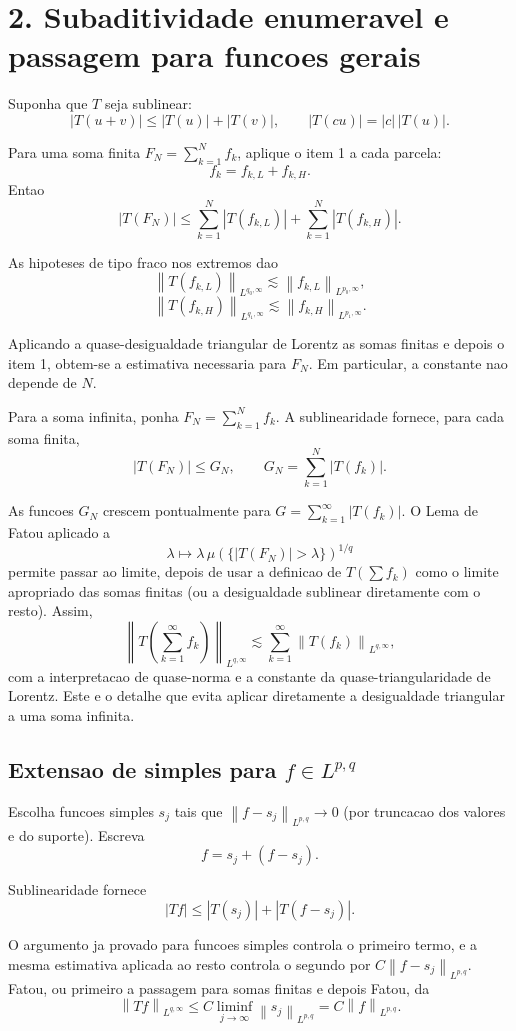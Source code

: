 \documentclass[12pt,a4paper]{article}
\newcommand{\norm}[2]{\left\|#1\right\|_{#2}}
\begin{document}
\section*{2. Subaditividade enumeravel e passagem para funcoes gerais}

Suponha que $T$ seja sublinear:
\[
|T(u+v)|\leq |T(u)|+|T(v)|, \qquad |T(cu)|=|c|\,|T(u)|.
\]

Para uma soma finita $F_N=\sum_{k=1}^Nf_k$, aplique o item 1 a cada parcela:
\[
f_k=f_{k,L}+f_{k,H}.
\]
Entao
\[
|T(F_N)|\leq\sum_{k=1}^N|T(f_{k,L})|
+\sum_{k=1}^N|T(f_{k,H})|.
\]

As hipoteses de tipo fraco nos extremos dao
\[
\norm{T(f_{k,L})}{L^{q_0,\infty}}
\lesssim \norm{f_{k,L}}{L^{p_0,\infty}},
\]
\[
\norm{T(f_{k,H})}{L^{q_1,\infty}}
\lesssim \norm{f_{k,H}}{L^{p_1,\infty}}.
\]

Aplicando a quase-desigualdade triangular de Lorentz as somas finitas e depois
o item 1, obtem-se a estimativa necessaria para $F_N$. Em particular, a
constante nao depende de $N$.

Para a soma infinita, ponha $F_N=\sum_{k=1}^Nf_k$. A sublinearidade fornece,
para cada soma finita,
\[
|T(F_N)|\leq G_N, \qquad G_N=\sum_{k=1}^N|T(f_k)|.
\]

As funcoes $G_N$ crescem pontualmente para
$G=\sum_{k=1}^{\infty}|T(f_k)|$. O Lema de Fatou aplicado a
\[
\lambda\longmapsto
\lambda\,\mu(\{|T(F_N)|>\lambda\})^{1/q}
\]
permite passar ao limite, depois de usar a definicao de $T(\sum f_k)$ como o
limite apropriado das somas finitas (ou a desigualdade sublinear diretamente
com o resto). Assim,
\[
\norm{T(\sum_{k=1}^{\infty}f_k)}{L^{q,\infty}}
\lesssim\sum_{k=1}^{\infty}\norm{T(f_k)}{L^{q,\infty}},
\]
com a interpretacao de quase-norma e a constante da quase-triangularidade de
Lorentz. Este e o detalhe que evita aplicar diretamente a desigualdade
triangular a uma soma infinita.

\subsection*{Extensao de simples para $f\in L^{p,q}$}

Escolha funcoes simples $s_j$ tais que
$\norm{f-s_j}{L^{p,q}}\to 0$ (por truncacao dos valores e do suporte). Escreva
\[
f=s_j+(f-s_j).
\]

Sublinearidade fornece
\[
|Tf|\leq |T(s_j)|+|T(f-s_j)|.
\]

O argumento ja provado para funcoes simples controla o primeiro termo, e a
mesma estimativa aplicada ao resto controla o segundo por
$C\norm{f-s_j}{L^{p,q}}$. Fatou, ou primeiro a passagem para somas finitas e
depois Fatou, da
\[
\norm{Tf}{L^{q,\infty}}\leq C\liminf_{j\to\infty}\norm{s_j}{L^{p,q}}
=C\norm{f}{L^{p,q}}.
\]
\end{document}
